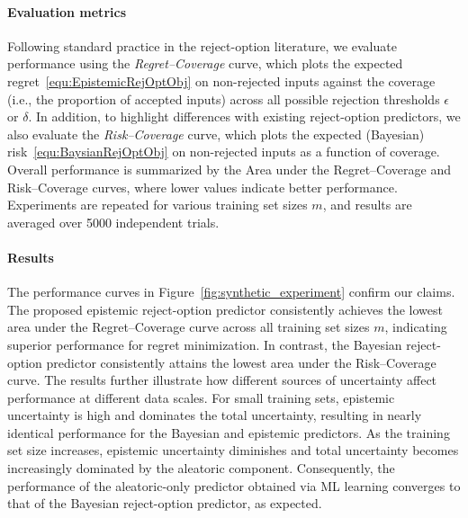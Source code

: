 \paragraph{Evaluation metrics} 

Following standard practice in the reject-option literature, we evaluate performance using the \emph{Regret–Coverage} curve, which plots the expected regret~\eqref{equ:EpistemicRejOptObj} on non-rejected inputs against the coverage (i.e., the proportion of accepted inputs) across all possible rejection thresholds \(\epsilon\) or \(\delta\). In addition, to highlight differences with existing reject-option predictors, we also evaluate the \emph{Risk–Coverage} curve, which plots the expected (Bayesian) risk~\eqref{equ:BaysianRejOptObj} on non-rejected inputs as a function of coverage. Overall performance is summarized by the Area under the Regret–Coverage and Risk–Coverage curves, where lower values indicate better performance. Experiments are repeated for various training set sizes \(m\), and results are averaged over 5000 independent trials.


\paragraph{Results}
The performance curves in Figure~\ref{fig:synthetic_experiment} confirm our claims. The proposed epistemic reject-option predictor consistently achieves the lowest area under the Regret–Coverage curve across all training set sizes \(m\), indicating superior performance for regret minimization. In contrast, the Bayesian reject-option predictor consistently attains the lowest area under the Risk–Coverage curve. The results further illustrate how different sources of uncertainty affect performance at different data scales. For small training sets, epistemic uncertainty is high and dominates the total uncertainty, resulting in nearly identical performance for the Bayesian and epistemic predictors. As the training set size increases, epistemic uncertainty diminishes and total uncertainty becomes increasingly dominated by the aleatoric component. Consequently, the performance of the aleatoric-only predictor obtained via ML learning converges to that of the Bayesian reject-option predictor, as expected.


